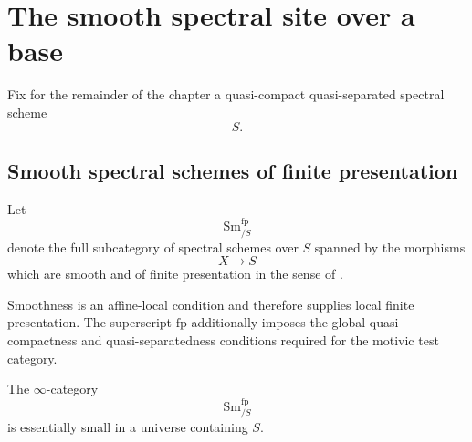 \section{The smooth spectral site over a base}
\label{sec:smooth-spectral-site}

Fix for the remainder of the chapter a quasi-compact quasi-separated
spectral scheme
\[
    S.
\]

\subsection{Smooth spectral schemes of finite presentation}

\begin{definition}
\label{def:smooth-spectral-test-category}
Let
\[
    \operatorname{Sm}^{\mathrm{fp}}_{/S}
\]
denote the full subcategory of spectral schemes over $S$ spanned by the
morphisms
\[
    X
    \longrightarrow
    S
\]
which are smooth and of finite presentation in the sense of
.
\end{definition}

Smoothness is an affine-local condition and therefore supplies local
finite presentation. The superscript $\mathrm{fp}$ additionally imposes
the global quasi-compactness and quasi-separatedness conditions required
for the motivic test category.

\begin{proposition}
\label{prop:smooth-site-essentially-small}
The $\infty$-category
\[
    \operatorname{Sm}^{\mathrm{fp}}_{/S}
\]
is essentially small in a universe containing $S$.
\end{proposition}

